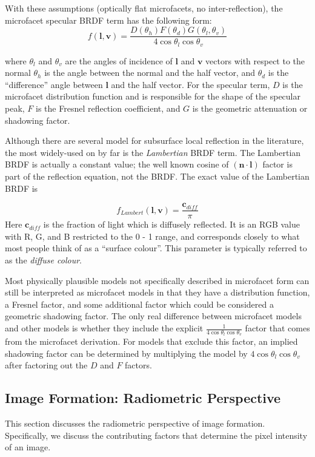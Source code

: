 With these assumptions (optically flat microfacets, no inter-reflection), the microfacet specular BRDF term has the following form:
$$
f(\mathbf{l}, \mathbf{v}) = \frac{D(\theta_h)F(\theta_d)G(\theta_l, \theta_v)}{4\cos\theta_l\cos\theta_v}
$$

where $\theta_l$ and $\theta_v$ are the angles of incidence of $\mathbf{l}$ and $\mathbf{v}$ vectors with respect to the normal $\theta_h$ is the angle between the normal and the half vector, and $\theta_d$ is the ``difference'' angle between $\mathbf{l}$ and the half vector. For the specular term, $D$ is the microfacet distribution function and is responsible for the shape of the specular peak, $F$ is the Fresnel reflection coefficient, and $G$ is the geometric attenuation or shadowing factor. 

Although there are several model for subsurface local reflection in the literature, the most widely-used on by far is the \textit{Lambertian} BRDF term. The Lambertian BRDF is actually a constant value; the well known cosine of $(\mathbf{n}\cdot\mathbf{l})$ factor is part of the reflection equation, not the BRDF. The exact value of the Lambertian BRDF is

$$
f_{Lambert}(\mathbf{l}, \mathbf{v}) = \frac{\mathbf{c}_{diff}}{\pi}
$$
Here $\mathbf{c}_{diff}$ is the fraction of light which is diffusely reflected. It is an RGB value with R, G, and B restricted to the 0 - 1 range, and corresponds closely to what most people think of as a ``surface colour''. This parameter is typically referred to as the \textit{diffuse colour}.

Most physically plausible models not specifically described in microfacet form can still be interpreted as microfacet models in that they have a distribution function, a Fresnel factor, and some additional factor which could be considered a geometric shadowing factor. The only real difference
between microfacet models and other models is whether they include the explicit $\frac{1}{4\cos\theta_l\cos\theta_v}$ factor that comes from the microfacet derivation. For models that exclude this factor, an implied shadowing factor can be determined by multiplying the model by $4\cos\theta_l\cos\theta_v$ after factoring out the $D$ and $F$ factors.

\subsection{Image Formation: Radiometric Perspective}
This section discusses the radiometric perspective of image formation. Specifically, we discuss the contributing factors that determine the pixel intensity of an image.

